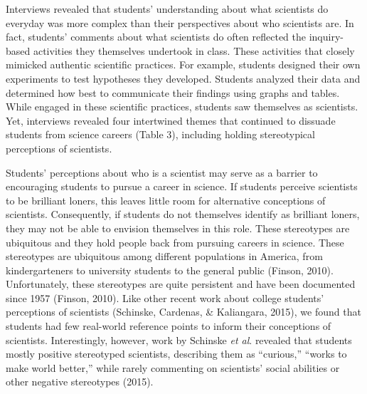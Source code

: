 \documentclass[11.5pt]{sig-alternate} %
\begin{document}
\begin{large}
Interviews revealed that students’ understanding about what scientists do everyday was more complex than their perspectives about who scientists are. In fact, students’ comments about what scientists do often reflected the inquiry-based activities they themselves undertook in class. These activities that closely mimicked authentic scientific practices. For example, students designed their own experiments to test hypotheses they developed. Students analyzed their data and determined how best to communicate their findings using graphs and tables. While engaged in these scientific practices, students saw themselves as scientists. Yet, interviews revealed four intertwined themes that continued to dissuade students from science careers (Table 3), including holding stereotypical perceptions of scientists. 

Students’ perceptions about who is a scientist may serve as a barrier to encouraging students to pursue a career in science. If students perceive scientists to be brilliant loners, this leaves little room for alternative conceptions of scientists. Consequently, if students do not themselves identify as brilliant loners, they may not be able to envision themselves in this role. These stereotypes are ubiquitous and they hold people back from pursuing careers in science. These stereotypes are ubiquitous among different populations in America, from kindergarteners to university students to the general public (Finson, 2010). Unfortunately, these stereotypes are quite persistent and have been documented since 1957 (Finson, 2010). Like other recent work about college students’ perceptions of scientists (Schinske, Cardenas, \& Kaliangara, 2015), we found that students had few real-world reference points to inform their conceptions of scientists. Interestingly, however, work by Schinske \textit{et al}. revealed that students mostly positive stereotyped scientists, describing them as “curious,” “works to make world better,” while rarely commenting on scientists’ social abilities or other negative stereotypes (2015). 


\end{large}
\end{document}
